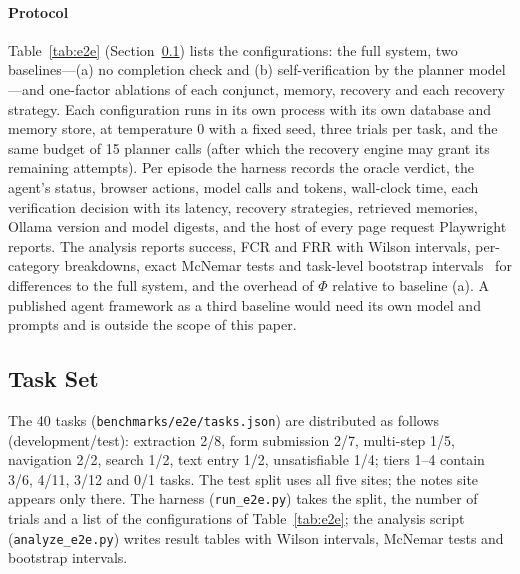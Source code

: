 \paragraph{Protocol} Table~\ref{tab:e2e} (Section~\ref{app:tasks}) lists the configurations: the full system, two baselines---(a) no completion check and (b) self-verification by the planner model---and one-factor ablations of each conjunct, memory, recovery and each recovery strategy. Each configuration runs in its own process with its own database and memory store, at temperature 0 with a fixed seed, three trials per task, and the same budget of 15 planner calls (after which the recovery engine may grant its remaining attempts). Per episode the harness records the oracle verdict, the agent's status, browser actions, model calls and tokens, wall-clock time, each verification decision with its latency, recovery strategies, retrieved memories, Ollama version and model digests, and the host of every page request Playwright reports. The analysis reports success, FCR and FRR with Wilson intervals, per-category breakdowns, exact McNemar tests and task-level bootstrap intervals~\cite{efron1979bootstrap} for differences to the full system, and the overhead of $\Phi$ relative to baseline (a). A published agent framework as a third baseline would need its own model and prompts and is outside the scope of this paper.


\subsection{Task Set}
\label{app:tasks}

The 40 tasks (\texttt{benchmarks/e2e/tasks.json}) are distributed as follows (development/test): extraction 2/8, form submission 2/7, multi-step 1/5, navigation 2/2, search 1/2, text entry 1/2, unsatisfiable 1/4; tiers 1--4 contain 3/6, 4/11, 3/12 and 0/1 tasks. The test split uses all five sites; the notes site appears only there. The harness (\texttt{run\_e2e.py}) takes the split, the number of trials and a list of the configurations of Table~\ref{tab:e2e}; the analysis script (\texttt{analyze\_e2e.py}) writes result tables with Wilson intervals, McNemar tests and bootstrap intervals.


